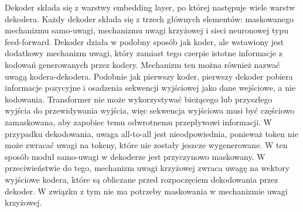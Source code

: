 \documentclass[12pt,a4paper,twoside]{book} %
\begin{document}
Dekoder składa się z warstwy embedding layer, po której następuje wiele warstw dekodera.
Każdy dekoder składa się z trzech głównych elementów: maskowanego mechanizmu samo-uwagi, mechanizmu uwagi krzyżowej i sieci neuronowej typu feed-forward.
Dekoder działa w podobny sposób jak koder, ale wstawiony jest dodatkowy mechanizm uwagi, który zamiast tego czerpie istotne informacje z kodowań generowanych przez kodery. 
Mechanizm ten można również nazwać uwagą kodera-dekodera.
Podobnie jak pierwszy koder, pierwszy dekoder pobiera informacje pozycyjne i osadzenia sekwencji wyjściowej jako dane wejściowe, a nie kodowania.
Transformer nie może wykorzystywać bieżącego lub przyszłego wyjścia do przewidywania wyjścia, więc sekwencja wyjściowa musi być częściowo zamaskowana, aby zapobiec temu odwrotnemu przepływowi informacji. 
W przypadku dekodowania, uwaga all-to-all jest nieodpowiednia, ponieważ token nie może zwracać uwagi na tokeny, które nie zostały jeszcze wygenerowane.
W ten sposób moduł samo-uwagi w dekoderze jest przyczynowo maskowany.
W przeciwieństwie do tego, mechanizm uwagi krzyżowej zwraca uwagę na wektory wyjściowe kodera, które są obliczane przed rozpoczęciem dekodowania przez dekoder.
W związku z tym nie ma potrzeby maskowania w mechanizmie uwagi krzyżowej.
\end{document}
